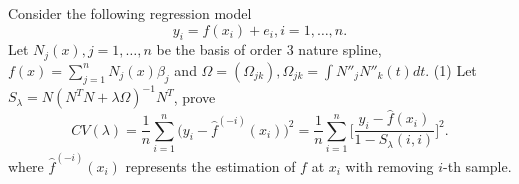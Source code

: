 \begin{problem}[16.1]
    Consider the following regression model
    \begin{equation*}
        y_i=f(x_i)+e_i,i=1,\ldots,n.
    \end{equation*}
    Let $N_j(x), j=1,\ldots,n$ be the basis of order $3$ nature spline, $f(x)=\sum_{j=1}^nN_j(x)\beta_j$ and $\Omega=(\Omega_{jk}), \Omega_{jk}=\int N''_jN''_k(t)dt$.
    (1) Let $S_\lambda=N(N^TN+\lambda\Omega)^{-1}N^T$, prove
    \begin{equation*}
        CV(\lambda)=\frac1n\sum_{i=1}^n\Big(y_i-\hat{f}^{(-i)}(x_i)\Big)^2=\frac1n\sum_{i=1}^n\Big[\frac{y_i-\hat{f}(x_i)}{1-S_\lambda(i,i)}\Big]^2.
    \end{equation*}
    where $\hat{f}^{(-i)}(x_i)$ represents the estimation of $f$ at $x_i$ with removing $i$-th sample.
\end{problem}